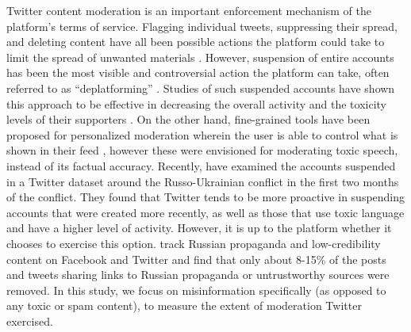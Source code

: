 Twitter content moderation is an important enforcement mechanism of the platform's terms of service. 
Flagging individual tweets, suppressing their spread, and deleting content have all been possible actions the platform could take to limit the spread of unwanted materials \cite{zannettou2021won}. 
However, suspension of entire accounts has been the most visible and controversial action the platform can take, often referred to as ``deplatforming'' \cite{jhaver2021evaluating}.
Studies of such suspended accounts have shown this approach to be effective in decreasing the overall activity and the toxicity levels of their supporters \cite{jhaver2021evaluating}.
On the other hand, fine-grained tools have been proposed for personalized moderation wherein the user is able to control what is shown in their feed \cite{jhaver2023personalizing}, however these were envisioned for moderating toxic speech, instead of its factual accuracy.
Recently, \citet{pierri2023does} have examined the accounts suspended in a Twitter dataset around the Russo-Ukrainian conflict in the first two months of the conflict. 
They found that Twitter tends to be more proactive in suspending accounts that were created more recently, as well as those that use toxic language and have a higher level of activity. 
However, it is up to the platform whether it chooses to exercise this option.
\citet{pierri2023propaganda} track Russian propaganda and low-credibility content on Facebook and Twitter and find that only about 8-15\% of the posts and tweets sharing links to Russian propaganda or untrustworthy sources were removed.
In this study, we focus on misinformation specifically (as opposed to any toxic or spam content), to measure the extent of moderation Twitter exercised.






